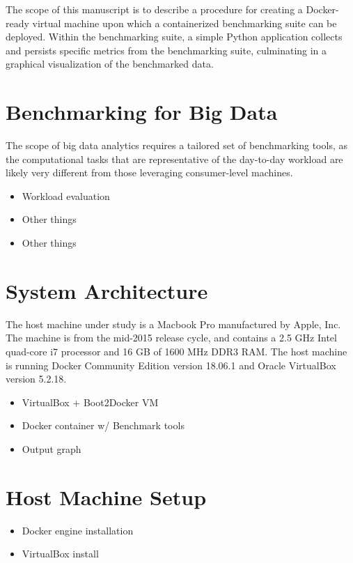 \documentclass[sigconf]{acmart}
\begin{document}
The scope of this manuscript is to describe a procedure for creating a Docker-ready virtual machine upon which a containerized benchmarking suite can be deployed. Within the benchmarking suite, a simple Python application collects and persists specific metrics from the benchmarking suite, culminating in a graphical visualization of the benchmarked data. 

\section{Benchmarking for Big Data}

The scope of big data analytics requires a tailored set of benchmarking tools, as the computational tasks that are representative of the day-to-day workload are likely very different from those leveraging consumer-level machines.

\begin{itemize}
  \item Workload evaluation
  \item Other things
  \item Other things
\end{itemize}

\section{System Architecture}

The host machine under study is a Macbook Pro manufactured by Apple, Inc. The machine is from the mid-2015 release cycle, and contains a 2.5 GHz Intel quad-core i7 processor and 16 GB of 1600 MHz DDR3 RAM. The host machine is running Docker Community Edition version 18.06.1 and Oracle VirtualBox version 5.2.18. 

\begin{itemize}
  \item VirtualBox + Boot2Docker VM
  \item Docker container w/ Benchmark tools
  \item Output graph
\end{itemize}

\section{Host Machine Setup}

\begin{itemize}
  \item Docker engine installation
  \item VirtualBox install
\end{itemize}
\end{document}
